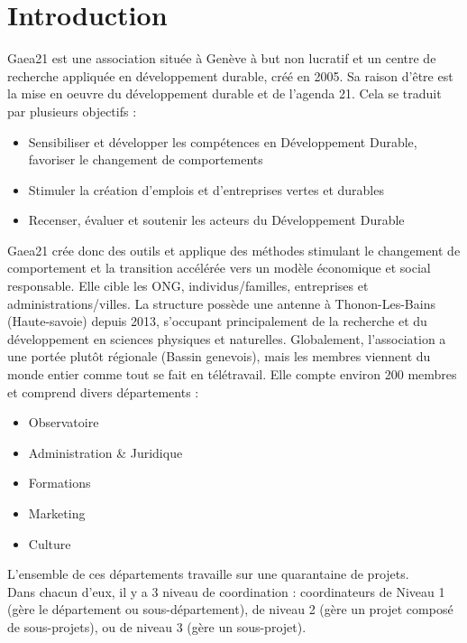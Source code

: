\section*{Introduction} 
{}
\thispagestyle{noTitledHeader}


Gaea21 est une association située à Genève à but non lucratif et un centre de recherche appliquée en développement durable, créé en 2005.
Sa raison d'être est la mise en oeuvre du développement durable et de l'agenda 21. Cela se traduit par plusieurs objectifs :
\begin{itemize}
    \item Sensibiliser et développer les compétences en Développement Durable, favoriser le changement
    de comportements 
    \item Stimuler la création d’emplois et d’entreprises vertes et durables
    \item Recenser, évaluer et soutenir les acteurs du Développement Durable
\end{itemize}

\bigbreak
Gaea21 crée donc des outils et applique des méthodes stimulant le changement de comportement et la transition
accélérée vers un modèle économique et social responsable.
Elle cible les ONG, individus/familles, entreprises et administrations/villes.
\bigbreak
La structure possède une antenne à Thonon-Les-Bains (Haute-savoie) depuis 2013, s'occupant principalement de la recherche et du développement en sciences physiques et naturelles.
Globalement, l'association a une portée plutôt régionale (Bassin genevois), mais les membres viennent du monde entier comme tout se fait en télétravail.
\bigbreak
Elle compte environ 200 membres et comprend divers départements :
\begin{itemize}
    \item Observatoire
    \item Administration \& Juridique 
    \item Formations
    \item Marketing
    \item Culture
\end{itemize} 

L'ensemble de ces départements travaille sur une quarantaine de projets.\\

Dans chacun d'eux, il y a 3 niveau de coordination : coordinateurs de Niveau 1 (gère le département ou sous-département), de niveau 2 (gère un projet composé de sous-projets), ou de niveau 3 (gère un sous-projet).


